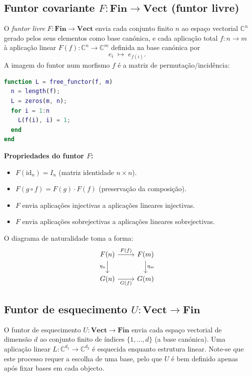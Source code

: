 \documentclass[12pt,a4paper]{article}
\newcommand{\catname}[1]{\mathbf{#1}}
\newcommand{\Fin}{\catname{Fin}}
\newcommand{\Vect}{\catname{Vect}}
\newcommand{\C}{\mathbb{C}}
\begin{document}
\subsection{Funtor covariante \texorpdfstring{$F \colon \Fin \to \Vect$}{F: Fin -> Vect} (funtor livre)}

O \emph{funtor livre} $F \colon \Fin \to \Vect$ envia cada conjunto finito $n$ ao espaço vectorial $\C^n$ gerado pelos seus elementos como base canónica, e cada aplicação total $f \colon n \to m$ à aplicação linear $F(f) \colon \C^n \to \C^m$ definida na base canónica por
\[
  e_i \;\longmapsto\; e_{f(i)}.
\]
A imagem do funtor num morfismo $f$ é a matriz de permutação/incidência:

\begin{lstlisting}[language=Matlab, caption={Funtor livre $F$ aplicado a um morfismo}]
function L = free_functor(f, m)
  n = length(f);
  L = zeros(m, n);
  for i = 1:n
    L(f(i), i) = 1;
  end
end
\end{lstlisting}

\noindent\textbf{Propriedades do funtor $F$:}
\begin{itemize}
  \item $F(\mathrm{id}_n) = I_n$ (matriz identidade $n \times n$).
  \item $F(g \circ f) = F(g) \cdot F(f)$ (preservação da composição).
  \item $F$ envia aplicações injectivas a aplicações lineares injectivas.
  \item $F$ envia aplicações sobrejectivas a aplicações lineares sobrejectivas.
\end{itemize}

O diagrama de naturalidade toma a forma:
\[
\begin{tikzcd}
  F(n) \arrow[r, "F(f)"] \arrow[d, "\eta_n"'] & F(m) \arrow[d, "\eta_m"] \\
  G(n) \arrow[r, "G(f)"']                     & G(m)
\end{tikzcd}
\]

\subsection{Funtor de esquecimento \texorpdfstring{$U \colon \Vect \to \Fin$}{U: Vect -> Fin}}

O funtor de esquecimento $U \colon \Vect \to \Fin$ envia cada espaço vectorial de dimensão $d$ ao conjunto finito de índices $\{1,\ldots,d\}$ (a base canónica). Uma aplicação linear $L \colon \C^{d_1} \to \C^{d_2}$ é esquecida enquanto estrutura linear. Note-se que este processo requer a escolha de uma base, pelo que $U$ é bem definido apenas após fixar bases em cada objecto.
\end{document}
